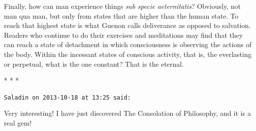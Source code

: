 Finally, how can man experience things \emph{sub specie aeternitatis}? Obviously, not man qua man, but only from states that are higher than the human state. To reach that highest state is what Guenon calls deliverance as opposed to salvation. Readers who continue to do their exercises and meditations may find that they can reach a state of detachment in which consciousness is observing the actions of the body. Within the incessant states of conscious activity, that is, the everlasting or perpetual, what is the one constant? That is the eternal.




\begin{center}* * *\end{center}

\begin{footnotesize}\begin{sffamily}



\texttt{Saladin on 2013-10-18 at 13:25 said: }

Very interesting! I have just discovered The Consolation of Philosophy, and it is a real gem!


\end{sffamily}\end{footnotesize}
